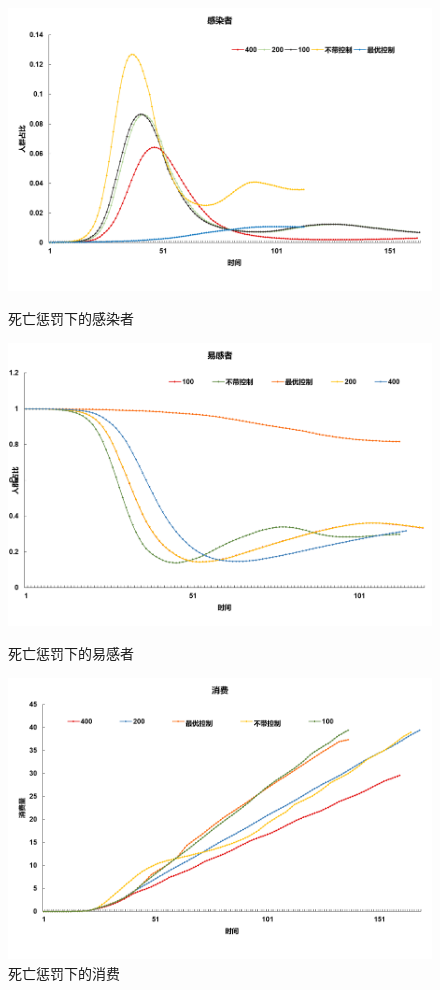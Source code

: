 \begin{figure}[htbp]
	\centering
	\begin{minipage}{0.49\linewidth}
		\centering
		\includegraphics[width=0.9\linewidth]{fig/image016.png}
		\caption{死亡惩罚下的感染者}
		\label{fig:ima8}%
	\end{minipage}
	\begin{minipage}{0.49\linewidth}
		\centering
		\includegraphics[width=0.9\linewidth]{fig/image018.png}
		\caption{死亡惩罚下的易感者}
		\label{fig:ima9}%
	\end{minipage}
	
	\begin{minipage}{0.49\linewidth}
		\centering
		\includegraphics[width=0.9\linewidth]{fig/image020.png}
		\caption{死亡惩罚下的消费}
		\label{fig:ima10}%
	\end{minipage}

\end{figure}

